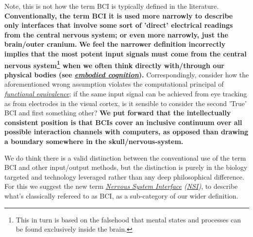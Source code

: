 \documentclass[logo,bsc,singlespacing,parskip]{infthesis}
\begin{document}
Note, this is not how the term BCI is typically defined in the literature.
\textbf{Conventionally, the term BCI it is used more narrowly to describe only interfaces that involve some sort of 'direct' electrical readings from the central nervous system; or even more narrowly, just the brain/outer cranium.}
\textbf{We feel the narrower definition incorrectly implies that the most potent input signals must come from the central nervous system\footnote{This in turn is based on the falsehood that mental states and processes can be found exclusively inside the brain.} when we often think directly with/through our physical bodies (see \emph{\hyperref[org80caeb7]{embodied cognition}}).}
Correspondingly, consider how the aforementioned wrong assumption violates the computational principal of \emph{\hyperref[orge7d4074]{functional equivalence}}; if the same input signal can be achieved from eye tracking as from electrodes in the visual cortex, is it sensible to consider the second 'True' BCI and first something other?
\textbf{We put forward that the intellectually consistent position is that BCIs cover an inclusive continuum over all possible interaction channels with computers, as opposed than drawing a boundary somewhere in the skull/nervous-system.}

We do think there is a valid distinction between the conventional use of the term BCI and other input/output methods, but the distinction is purely in the biology targeted and technology leveraged rather than any deep philosophical difference.
For this we suggest the new term \emph{\hyperref[org25c8a28]{Nervous System Interface} (\hyperref[orgbcfe20a]{NSI})}, to describe what's classically refereed to as BCI, as a sub-category of our wider definition.
\end{document}
